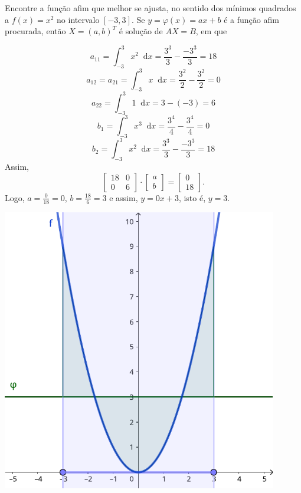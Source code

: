 \documentclass[12pt,a4paper]{article}
\newcommand*\diff{\mathop{}\!\mathrm{d}}
\begin{document}
\begin{ExerciseList}
\Exercise[title={2,5}] Encontre a função afim que melhor se ajusta, no sentido dos mínimos quadrados a $f(x) = x^2$ no intervalo $[-3, 3]$.
\Answer Se $y = \varphi(x) = a x + b$ é a função afim procurada, então $X = (a, b)^T$ é solução de $A X = B$, em que

\begin{minipage}{0.55\textwidth}

\[
   a_{11} = \int_{-3}^3 x^2 \diff{x} = \frac{3^3}{3} - \frac{-3^3}{3} = 18
\]
\[
   a_{12} = a_{21} = \int_{-3}^3 x \diff{x} = \frac{3^2}{2} - \frac{3^2}{2} = 0
\]
\[
   a_{22} = \int_{-3}^3 1 \diff{x} = 3 - (-3) = 6
\]
\[
   b_1 = \int_{-3}^3 x^3 \diff{x} = \frac{3^4}{4} - \frac{3^4}{4} = 0
\]
\[
   b_2 = \int_{-3}^3 x^2 \diff{x} = \frac{3^3}{3} - \frac{-3^3}{3} = 18
\]
Assim,
\[
   \begin{bmatrix}
      18 & 0 \\
      0 & 6
   \end{bmatrix}
   \cdot
   \begin{bmatrix}
      a \\
      b
   \end{bmatrix}
   =
   \begin{bmatrix}
      0 \\
      18
   \end{bmatrix}.
\]
Logo, $a = \frac{0}{18} = 0$, $b = \frac{18}{6} = 3$ e assim, $y = 0 x + 3$, isto é, $\boxed{y = 3}$.
    \end{minipage}\hfill
    \begin{minipage}{0.45\textwidth}
        \centering
        \includegraphics[width=0.9\textwidth]{img/mínimos-quadrados-contínuo.pdf}
    \end{minipage}




\end{ExerciseList}
\end{document}
